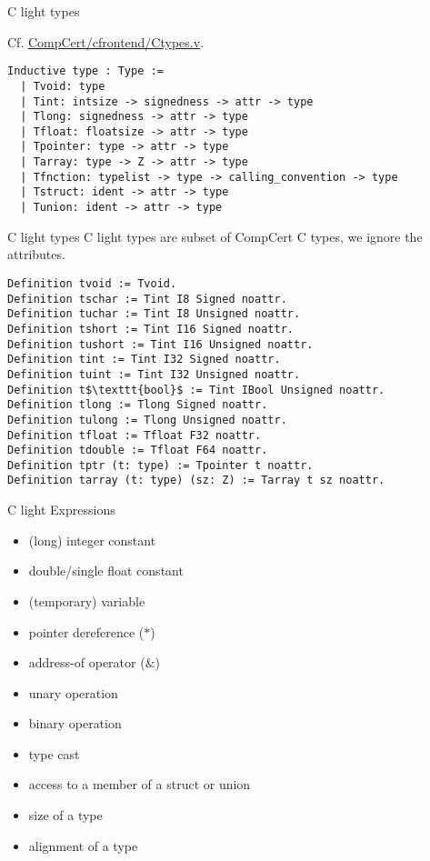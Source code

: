 \documentclass{beamer}
\begin{document}
\begin{frame}[fragile]{C light types}

  Cf. \url{CompCert/cfrontend/Ctypes.v}. 
  \begin{lstlisting}[language=Coq]
 Inductive type : Type :=
  | Tvoid: type 
  | Tint: intsize -> signedness -> attr -> type 
  | Tlong: signedness -> attr -> type 
  | Tfloat: floatsize -> attr -> type 
  | Tpointer: type -> attr -> type       
  | Tarray: type -> Z -> attr -> type              
  | Tfnction: typelist -> type -> calling_convention -> type   
  | Tstruct: ident -> attr -> type                 
  | Tunion: ident -> attr -> type                 
\end{lstlisting}


\end{frame}

\begin{frame}[fragile]{C light types}
  C light types are subset of CompCert C types, we ignore the attributes.
  \begin{lstlisting}[language=Coq]
Definition tvoid := Tvoid.
Definition tschar := Tint I8 Signed noattr.
Definition tuchar := Tint I8 Unsigned noattr.
Definition tshort := Tint I16 Signed noattr.
Definition tushort := Tint I16 Unsigned noattr.
Definition tint := Tint I32 Signed noattr.
Definition tuint := Tint I32 Unsigned noattr.
Definition t$\texttt{bool}$ := Tint IBool Unsigned noattr.
Definition tlong := Tlong Signed noattr.
Definition tulong := Tlong Unsigned noattr.
Definition tfloat := Tfloat F32 noattr.
Definition tdouble := Tfloat F64 noattr.
Definition tptr (t: type) := Tpointer t noattr.
Definition tarray (t: type) (sz: Z) := Tarray t sz noattr.
\end{lstlisting}

\end{frame}

\begin{frame}{C light Expressions}
  \begin{itemize}
  \item (long) integer constant
  \item double/single float constant
  \item (temporary) variable
  \item pointer dereference ($*$)
  \item address-of operator ($\&$)
  \item unary operation
  \item binary operation
  \item type cast
  \item access to a member of a struct or union
  \item size of a type
    \item alignment of a type
    \end{itemize}
  \end{frame}
\end{document}
